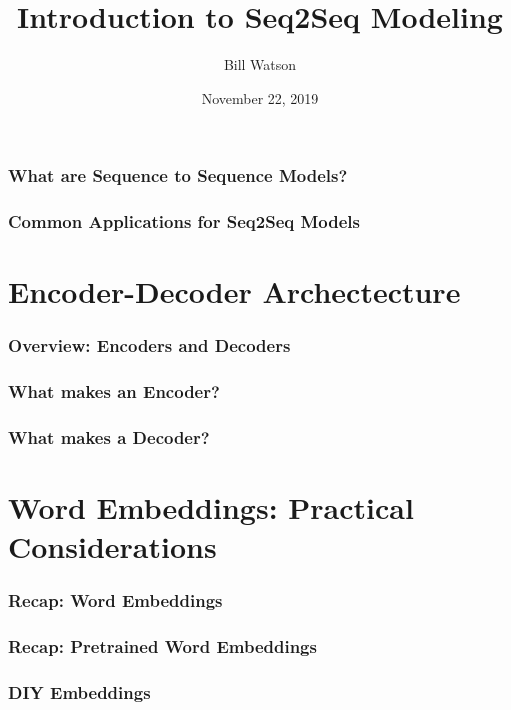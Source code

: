 \documentclass{beamer}
\title{Introduction to Seq2Seq Modeling}
\author{Bill Watson}
\institute{S\&P Global}
\date{November 22, 2019}
\begin{document}
\begin{frame}
\titlepage
\end{frame}


\begin{frame}
\frametitle{What are Sequence to Sequence Models?}

\end{frame}

\begin{frame}
\frametitle{Common Applications for Seq2Seq Models}

\end{frame}

\section{Encoder-Decoder Archectecture}

\begin{frame}
\frametitle{Overview: Encoders and Decoders}

\end{frame}

\begin{frame}
\frametitle{What makes an Encoder?}

\end{frame}

\begin{frame}
\frametitle{What makes a Decoder?}

\end{frame}


\section{Word Embeddings: Practical Considerations}

\begin{frame}
\frametitle{Recap: Word Embeddings}

\end{frame}


\begin{frame}
\frametitle{Recap: Pretrained Word Embeddings}

\end{frame}


\begin{frame}
\frametitle{DIY Embeddings}

\end{frame}
\end{document}
